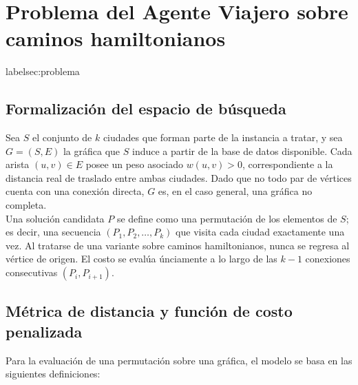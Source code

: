 \documentclass[9pt,a4paper,twocolumn,twoside]{tau-class/tau}
\begin{document}
\section{Problema del Agente Viajero sobre caminos hamiltonianos}label{sec:problema}

    \subsection{Formalizaci\'on del espacio de b\'usqueda}

        Sea $S$ el conjunto de $k$ ciudades que forman parte de la instancia a tratar, y sea $G=(S,E)$ la gráfica que $S$ induce a partir de la base de datos disponible. Cada arista $(u, v) \in E$ posee un peso asociado $w(u, v) > 0$, correspondiente a la distancia real de traslado entre ambas ciudades. Dado que no todo par de vértices cuenta con una conexión directa, $G$ es, en el caso general, una gráfica no completa.\\


        Una solución candidata $P$ se define como una permutación de los elementos de $S$; es decir, una secuencia $(P_1, P_2, \dots, P_k)$ que visita cada ciudad exactamente una vez. Al tratarse de una variante sobre caminos hamiltonianos, nunca se regresa al v\'ertice de origen. El costo se eval\'ua \'unciamente a lo largo de las $k-1$ conexiones consecutivas $(P_i, P_{i+1})$.

    \subsection{M\'etrica de distancia y funci\'on de costo penalizada}

        Para la evaluaci\'on de una permutaci\'on sobre una gr\'afica, el modelo se basa en las siguientes definiciones:
\end{document}
